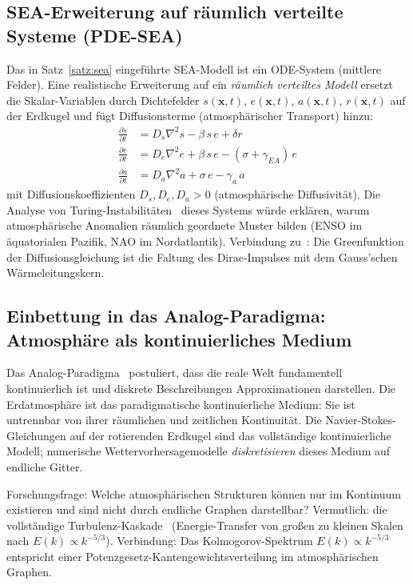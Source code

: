 ﻿\documentclass[a4paper,12pt]{article}
\theoremstyle{definition}
\begin{document}
\subsection{SEA-Erweiterung auf r\"aumlich verteilte Systeme (PDE-SEA)}

Das in Satz~\ref{satz:sea} eingef\"uhrte SEA-Modell ist ein ODE-System (mittlere
Felder). Eine realistische Erweiterung auf ein \emph{r\"aumlich verteiltes Modell}
ersetzt die Skalar-Variablen durch Dichtefelder $s(\mathbf{x},t)$, $e(\mathbf{x},t)$,
$a(\mathbf{x},t)$, $r(\mathbf{x},t)$ auf der Erdkugel und f\"ugt Diffusionsterme
(atmosph\"arischer Transport) hinzu:
\begin{align}
\frac{\partial s}{\partial t} &= D_s \nabla^2 s - \beta\, s\, e + \delta r \\
\frac{\partial e}{\partial t} &= D_e \nabla^2 e + \beta\, s\, e - (\sigma + \gamma_{EA})\,e \\
\frac{\partial a}{\partial t} &= D_a \nabla^2 a + \sigma\, e - \gamma_a\, a
\end{align}
mit Diffusionskoeffizienten $D_s, D_e, D_a > 0$ (atmosph\"arische Diffusivit\"at).
Die Analyse von Turing-Instabilit\"aten~\cite{turing1952} dieses Systems w\"urde
erkl\"aren, warum atmosph\"arische Anomalien r\"aumlich geordnete Muster bilden
(ENSO im \"aquatorialen Pazifik, NAO im Nordatlantik). Verbindung zu~\cite{epp2026dirac}:
Die Greenfunktion der Diffusionsgleichung ist die Faltung des Dirac-Impulses mit
dem Gauss'schen W\"armeleitungskern.

\subsection{Einbettung in das Analog-Paradigma: Atmosph\"are als kontinuierliches Medium}

Das Analog-Paradigma~\cite{epp2026analog} postuliert, dass die reale Welt
fundamentell kontinuierlich ist und diskrete Beschreibungen Approximationen darstellen.
Die Erdatmosph\"are ist das paradigmatische kontinuierliche Medium: Sie ist
untrennbar von ihrer r\"aumlichen und zeitlichen Kontinuit\"at.
Die Navier-Stokes-Gleichungen auf der rotierenden Erdkugel sind das
vollst\"andige kontinuierliche Modell; numerische Wettervorhersagemodelle
\emph{diskretisieren} dieses Medium auf endliche Gitter.

Forschungsfrage: Welche atmosph\"arischen Strukturen k\"onnen nur im Kontinuum
existieren und sind nicht durch endliche Graphen darstellbar? Vermutlich: die
vollst\"andige Turbulenz-Kaskade~\cite{kolmogorov1941} (Energie-Transfer von gro{\ss}en
zu kleinen Skalen nach $E(k) \propto k^{-5/3}$). Verbindung:
Das Kolmogorov-Spektrum $E(k) \propto k^{-5/3}$ entspricht einer
Potenzgesetz-Kantengewichtsverteilung im atmosph\"arischen Graphen.
\end{document}
